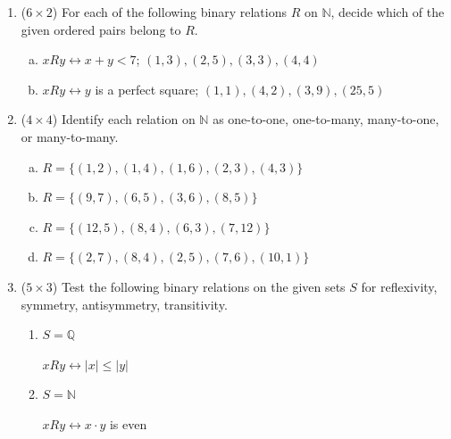 \documentclass[12pt]{article}
\newcommand{\ro}{R}
\begin{document}
	\begin{enumerate}
				\item ($6 \times 2$)
				For each of the following binary relations $\ro$ on $\mathbb{N}$, decide which of the given ordered pairs belong to $\ro$.
				\begin{enumerate}[a.]
					\item
					$x \ro y \leftrightarrow x + y < 7$; $\left(1, 3\right), \left(2, 5\right), \left(3, 3\right), \left(4, 4\right)$
						
					\item
					$x \ro y \leftrightarrow y$ is a perfect square; $\left(1, 1\right), \left(4, 2\right), \left(3, 9\right), \left(25, 5\right)$			
				\end{enumerate}
			
			
				\newpage
				\item ($4 \times 4$)
				Identify each relation on $\mathbb{N}$ as one-to-one, one-to-many, many-to-one, or many-to-many.
				\begin{enumerate}[a.]
					\item
					$\ro = \{\left(1, 2\right), \left(1, 4\right), \left(1, 6\right), \left(2, 3\right), \left(4, 3\right)\}$
					
					\item
					$\ro = \{\left(9, 7\right), \left(6, 5\right), \left(3, 6\right), \left(8, 5\right)\}$
					
					\item
					$\ro = \{\left(12, 5\right), \left(8, 4\right), \left(6, 3\right), \left(7, 12\right)\}$
					
					\item
					$\ro = \{\left(2, 7\right), \left(8, 4\right), \left(2, 5\right), \left(7, 6\right), \left(10, 1\right)\}$
				\end{enumerate}
			
				
				\newpage
				\item ($5 \times 3$)		
					Test the following binary relations on the given sets $S$ for reflexivity, symmetry, antisymmetry, transitivity.
					\begin{enumerate}
						\item
						$S = \mathbb{Q}$
						
						$x \ro y \leftrightarrow |x| \leq |y|$
						
						\item
						$S = \mathbb{N}$
						
						$x \ro y \leftrightarrow x \cdot y$ is even
						

\end{enumerate}
\end{enumerate}
\end{document}
